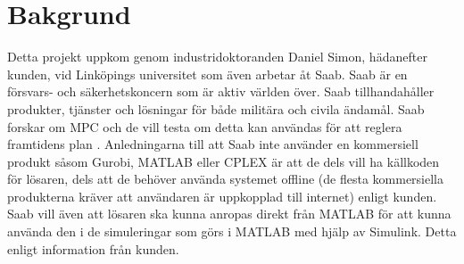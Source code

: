 \section{Bakgrund}    
Detta projekt uppkom genom industridoktoranden Daniel Simon, hädanefter kunden, vid Linköpings universitet som även arbetar åt Saab. 
\newline
\newline
Saab är en försvars- och säkerhetskoncern som är aktiv världen över. Saab tillhandahåller produkter, tjänster och lösningar för både militära och civila ändamål. \citep{SAABbrief}
\newline
\newline
Saab forskar om MPC och de vill testa om detta kan användas för att reglera framtidens plan \citep{danielSimon}.
Anledningarna till att Saab inte använder en kommersiell produkt såsom Gurobi, MATLAB eller CPLEX är att de dels vill ha källkoden för lösaren, dels att de behöver använda systemet offline (de flesta kommersiella produkterna kräver att användaren är uppkopplad till internet) enligt kunden.  
\newline
\newline
Saab vill även att lösaren ska kunna anropas direkt från MATLAB för att kunna använda den i de simuleringar som görs i MATLAB med hjälp av Simulink. Detta enligt information från kunden.  
